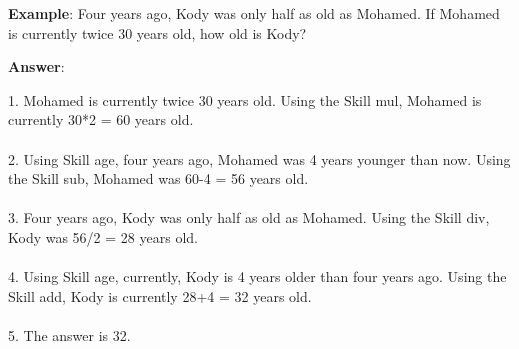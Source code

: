 \documentclass{article} \usepackage{arxiv}
\begin{document}
\begin{tcolorbox}[title = {An Example of Skill Composition for GSM8K}, colback = Apricot!25!white, colframe = BrickRed!75!black] 
\textbf{Example}:  Four years ago, Kody was only half as old as Mohamed. If Mohamed is currently twice 30 years old,  how old is Kody? 

 \quad

\textbf{Answer}:

1. Mohamed is currently twice 30 years old. Using the Skill mul, Mohamed is currently 30*2 = 60 years old. \\ \\
2. Using Skill age, four years ago, Mohamed was 4 years younger than now. Using the Skill sub,  Mohamed was 60-4 = 56 years old.  \\ \\
3. Four years ago, Kody was only half as old as Mohamed. Using the Skill div, Kody was 56/2 = 28 years old. \\ \\
4. Using Skill age, currently, Kody is 4 years older than four years ago. Using the Skill add, Kody is currently 28+4 = 32 years old. \\ \\
5. The answer is 32. 
\end{tcolorbox}
\noindent\begin{minipage}{\textwidth}  
 \label{Tab:compose_gsm8k_skill}
\end{minipage}

\newpage
\end{document}
